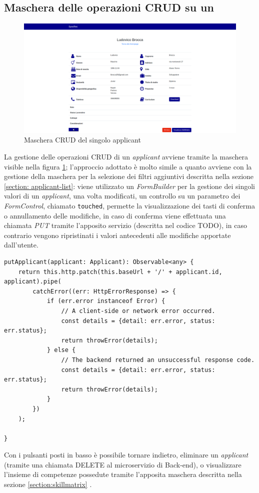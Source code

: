 \subsection{Maschera delle operazioni CRUD su un\applicant}\label{CRUD}
\vspace{0.5em}
\begin{figure}[!h] 
	\centering 
	\includegraphics[width=1\columnwidth]{immagini/svil/applicant}
	\caption{Maschera CRUD del singolo applicant}
	\label{figura:applicant}
\end{figure}
La gestione delle operazioni \gls{CRUD} di un \textit{applicant} avviene tramite la maschera visible nella figura \ref{figura:applicant}; l'approccio adottato è molto simile a quanto avviene con la gestione della maschera per la selezione dei filtri aggiuntivi descritta nella sezione \ref{section: applicant-list}: viene utilizzato un \textit{FormBuilder} per la gestione dei singoli valori di un \textit{applicant}, una volta modificati, un controllo su un parametro dei \textit{FormControl}, chiamato \texttt{touched}, permette la visualizzazione dei tasti di conferma o annullamento delle modifiche, in caso di conferma viene effettuata una chiamata \textit{PUT} tramite l'apposito servizio (descritta nel codice TODO), in caso contrario vengono ripristinati i valori antecedenti alle modifiche apportate dall'utente.\\
\newpage
\begin{lstlisting}[label=PUT-call, caption=chiamata PUT al microservizio del Back-end di SyncRec]
putApplicant(applicant: Applicant): Observable<any> {
	return this.http.patch(this.baseUrl + '/' + applicant.id, applicant).pipe(
		catchError((err: HttpErrorResponse) => {
			if (err.error instanceof Error) {
				// A client-side or network error occurred.
				const details = {detail: err.error, status: err.status};
				return throwError(details);
			} else {
				// The backend returned an unsuccessful response code.
				const details = {detail: err.error, status: err.status};
				return throwError(details);
			}
		})
	);
	
}
\end{lstlisting}
Con i pulsanti posti in basso è possibile tornare indietro, eliminare un \textit{applicant} (tramite una chiamata DELETE al microservizio di Back-end), o visualizzare l'insieme di competenze possedute tramite l'apposita maschera descritta nella sezione \ref{section:skillmatrix}
\vspace{0.5em}.


